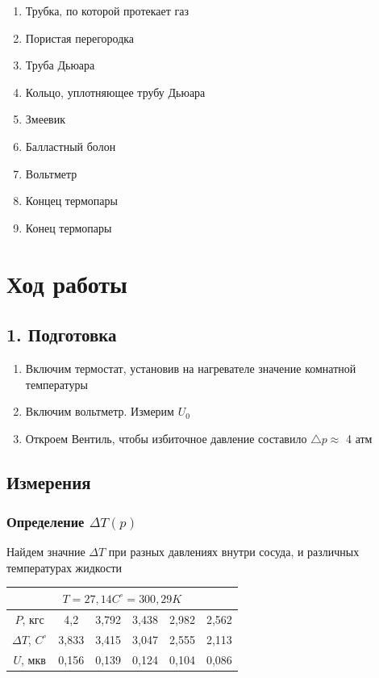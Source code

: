 \documentclass[a4paper,12pt]{article}
\theoremstyle{plain} %
\theoremstyle{definition} %
\theoremstyle{remark} %
\begin{document}
\begin{enumerate}
  \item Трубка, по которой протекает газ
  \item Пористая перегородка
  \item Труба Дьюара
  \item Кольцо, уплотняющее трубу Дьюара
  \item Змеевик
  \item Балластный болон
  \item	Вольтметр
  \item Концец термопары
  \item Конец термопары
\end{enumerate}


\newpage



\section {Ход работы}
\subsection*{1. Подготовка}

\begin{enumerate}
  \item Включим термостат, установив на нагревателе значение комнатной температуры
  \item Включим вольтметр. Измерим $U_{0}$
  \item Откроем Вентиль, чтобы избиточное давление составило $\triangle p \approx$ 4 атм

\end{enumerate}

\subsection{ Измерения}
\subsubsection{Определение  $\Delta T(p)$ }Найдем значние $\Delta T$  при разных давлениях внутри сосуда, и различных температурах жидкости

    \begin{center}
    		\begin{tabular}{|c|c|c|c|c|c|}
    		\hline 
    		\multicolumn{6}{|c|}{$T=27,14C^\circ = 300,29K$} \\ 
    		\hline 
   		 $P$, кгс & 4,2 & 3,792 & 3,438 & 2,982 & 2,562 \\ 
   		 \hline 
    		$\Delta T$, $C^\circ$ & 3,833 & 3,415 & 3,047 & 2,555 & 2,113 \\ 
    		\hline 
    		$U$, мкв & 0,156 & 0,139 & 0,124 & 0,104 & 0,086 \\ 
    \hline 
    \end{tabular}
    \end{center}
\end{document}
